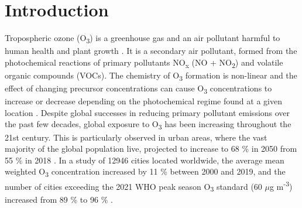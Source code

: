 \documentclass[journal abbreviation, manuscript]{copernicus}
\begin{document}
\section{Introduction}  %
Tropospheric ozone (O\textsubscript{3}) is a greenhouse gas and an air pollutant harmful to human health and plant growth \citep{fleming_2018, mills_2018, szopa_2021}. It is a secondary air pollutant, formed from the photochemical reactions of primary pollutants NO\textsubscript{x} (NO + NO\textsubscript{2}) and volatile organic compounds (VOCs). The chemistry of O\textsubscript{3} formation is non-linear and the effect of changing precursor concentrations can cause O\textsubscript{3} concentrations to increase or decrease depending on the photochemical regime found at a given location \citep{ https://doi.org/10.1029/JD095iD02p01837, SILLMAN2002339}. Despite global successes in reducing primary pollutant emissions over the past few decades, global exposure to O\textsubscript{3} has been increasing throughout the 21st century. This is particularly observed in urban areas, where the vast majority of the global population live, projected to increase to 68 \% in 2050 from 55 \% in 2018 \citep{un_2019}. In a study of 12946 cities located worldwide, the average mean weighted O\textsubscript{3} concentration increased by 11 \% between 2000 and 2019, and the number of cities exceeding the 2021 WHO peak season O\textsubscript{3} standard (60 $\mu$g m\textsuperscript{-3}) increased from 89 \% to 96 \% \citep{Malashock_2022}.
\end{document}
